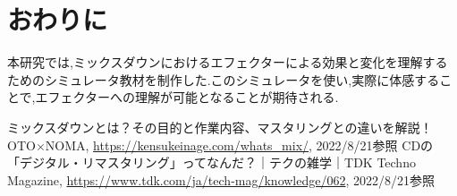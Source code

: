 \documentclass[twocolumn,10pt,a4j]{ltjsarticle}
\begin{document}
\section{おわりに}
本研究では,ミックスダウンにおけるエフェクターによる効果と変化を理解するためのシミュレータ教材を制作した.このシミュレータを使い,実際に体感することで,エフェクターへの理解が可能となることが期待される.

\begin{thebibliography}{99}
 ミックスダウンとは？その目的と作業内容、マスタリングとの違いを解説！  OTO$\times$NOMA, \url{https://kensukeinage.com/whats_mix/}, 2022/8/21参照
 CDの「デジタル・リマスタリング」ってなんだ？｜テクの雑学｜TDK Techno Magazine, \url{https://www.tdk.com/ja/tech-mag/knowledge/062}, 2022/8/21参照
\end{thebibliography}
\end{document}
